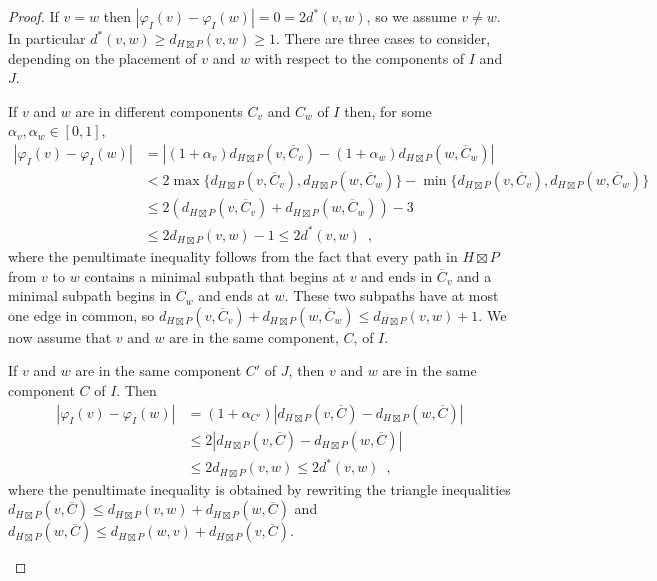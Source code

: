 \documentclass{patmorin}
\renewcommand{\ge}{\geqslant}
\renewcommand{\le}{\leqslant}
\begin{document}
\begin{proof}
  If $v=w$ then $|\varphi_I(v)-\varphi_I(w)|=0 = 2 d^*(v,w)$, so we assume $v\neq w$. In particular $d^*(v,w)\ge d_{H\boxtimes P}(v,w)\ge 1$.  There are three cases to consider, depending on the placement of $v$ and $w$ with respect to the components of $I$ and $J$.

  \begin{compactenum}
    \item  If $v$ and $w$ are in different components $C_v$ and $C_w$ of $I$ then, for some $\alpha_v,\alpha_w\in[0,1]$,
    \begin{align*}
       |\varphi_I(v)-\varphi_I(w)|
      & =|(1+\alpha_v)d_{H\boxtimes P}(v,\overline{C}_v)-(1+\alpha_w)d_{H\boxtimes P}(w,\overline{C}_w)| \\
      & < 2\max\{d_{H\boxtimes P}(v,\overline{C}_v), d_{H\boxtimes P}(w,\overline{C}_w)\}
      - \min\{d_{H\boxtimes P}(v,\overline{C}_v), d_{H\boxtimes P}(w,\overline{C}_w)\} \\
      & \le 2\left(d_{H\boxtimes P}(v,\overline{C}_v) + d_{H\boxtimes P}(w,\overline{C}_w)\right) - 3\\
      & \le 2d_{H\boxtimes P}(v,w) - 1 \le 2d^*(v,w) \enspace ,
    \end{align*}
    where the penultimate inequality follows from the fact that every path in $H\boxtimes P$ from $v$ to $w$ contains a minimal subpath that begins at $v$ and ends in $\overline{C}_v$ and a minimal subpath begins in $\overline{C}_w$ and ends at $w$.  These two subpaths have at most one edge in common, so
    $d_{H\boxtimes P}(v,\overline{C}_v) + d_{H\boxtimes P}(w,\overline{C}_w) \le d_{H\boxtimes P}(v,w)+1$.  We now  assume that $v$ and $w$ are in the same component, $C$, of $I$.

    \item If $v$ and $w$ are in the same component $C'$ of $J$, then $v$ and $w$ are in the same component $C$ of $I$.  Then
    \begin{align*}
      |\varphi_I(v)-\varphi_I(w)|
      & =(1+\alpha_{C'})|d_{H\boxtimes P}(v,\overline{C})-d_{H\boxtimes P}(w,\overline{C})| \\
      & \le 2|d_{H\boxtimes P}(v,\overline{C})-d_{H\boxtimes P}(w,\overline{C})| \\
      & \le 2 d_{H\boxtimes P}(v,w) \le 2d^*(v,w) \enspace ,
    \end{align*}
    where the penultimate inequality is obtained by rewriting the triangle inequalities $d_{H\boxtimes P}(v,\overline{C})\le d_{H\boxtimes P}(v,w)+d_{H\boxtimes P}(w,\overline{C})$ and $d_{H\boxtimes P}(w,\overline{C})\le d_{H\boxtimes P}(w,v)+d_{H\boxtimes P}(v,\overline{C})$.


\end{compactenum}
\end{proof}
\end{document}

